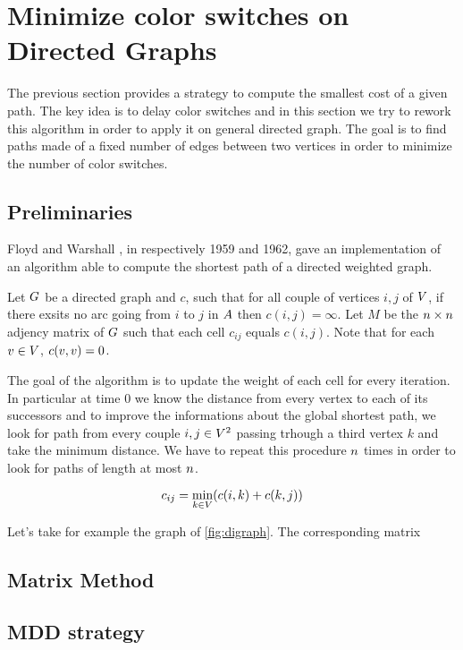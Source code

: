 \section{Minimize color switches on Directed Graphs}

The previous section provides a strategy to compute the smallest cost of a given path. The key idea is to delay color switches and in this section we try to rework this algorithm in order to apply it on general directed graph. The goal is to find paths made of a fixed number of edges between two vertices in order to minimize the number of color switches.

\subsection{Preliminaries}

Floyd \cite[]{floyd} and Warshall \cite{warshall}, in respectively 1959 and 1962, gave an implementation \cite[]{floydalgo} of an algorithm able to compute the shortest path of a directed weighted graph.

Let $G$ be a directed graph and $c$, such that for all couple of vertices $i,j$ of $V$, if there exsits no arc going from $i$ to $j$ in $A$ then  $c(i,j) = \infty$. Let $M$ be the $n \times n$ adjency matrix of $G$ such that each cell $c_{ij}$ equals $c(i, j)$. Note that for each $v \in V$, $c(v, v) = 0$.

The goal of the algorithm is to update the weight of each cell for every iteration. In particular at time $0$ we know the distance from every vertex to each of its successors and to improve the informations about the global shortest path, we look for path from every couple $i, j \in V^2$ passing trhough a third vertex $k$ and take the minimum distance. We have to repeat this procedure $n$ times in order to look for paths of length at most $n$.

$$c_{ij} = \min_{k \in V} (c(i, k) + c(k, j))$$





Let's take for example the graph of \cref{fig:digraph}. The corresponding matrix

\subsection{Matrix Method}

\subsection{MDD strategy}